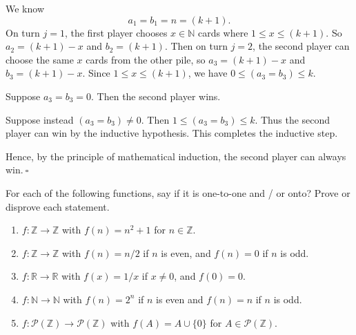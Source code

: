 \documentclass{article}
\newcommand{\Z}{\mathbb{Z}}
\newcommand{\N}{\mathbb{N}}
\newcommand{\R}{\mathbb{R}}
\theoremstyle{definition}
\begin{document}
\begin{solution}
\begin{description}
We know
\[a_1=b_1=n=(k+1).\]
On turn $j=1$, the first player chooses $x\in\mathbb{N}$ cards where $1\leq x\leq (k+1)$. So $a_2=(k+1)-x$ and $b_2=(k+1)$. Then on turn $j=2$, the second player can choose the same $x$ cards from the other pile, so $a_3=(k+1)-x$ and $b_3=(k+1)-x$. Since $1\leq x\leq(k+1)$, we have $0\leq (a_3=b_3)\leq k$.

Suppose $a_3=b_3=0$. Then the second player wins.

Suppose instead $(a_3=b_3)\neq 0$. Then $1\leq(a_3=b_3)\leq k$. Thus the second player can win by the inductive hypothesis. This completes the inductive step.
\end{description}
Hence, by the principle of mathematical induction, the second player can always win.$~\square$
\end{solution}
\begin{question}
    For each of the following functions, say if it is one-to-one and / or onto? Prove or disprove each statement.
    \begin{enumerate}
	\item $f : \Z \to \Z$ with $f(n) = n^2 + 1$ for $n \in \Z$.
	\item $f : \Z \to \Z$ with $f(n) = n/2$ if $n$ is even, and $f(n) = 0$ if $n$ is odd.
	\item $f : \R \to \R$ with $f(x) = 1/x$ if $x \neq 0$, and $f(0) = 0$.
	\item $f: \N \to \N$ with $f(n) = 2^n$ if $n$ is even and $f(n) = n$ if $n$ is odd.
	\item $f : \mathcal{P}(\Z) \to \mathcal{P}(\Z)$ with $f(A) = A \cup \{ 0 \}$ for $A \in \mathcal{P}(\Z)$.
    \end{enumerate}
\end{question}
\end{document}
